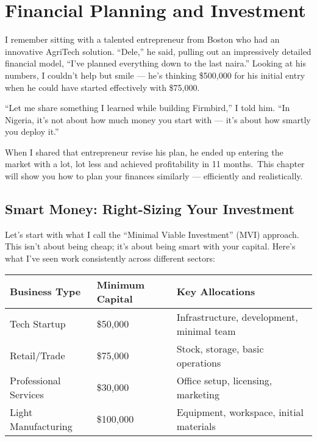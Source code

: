 \chapter{Financial Planning and Investment}\label{ch:financial-planning}

I remember sitting with a talented entrepreneur from Boston who had an innovative AgriTech solution. ``Dele,'' he said, pulling out an impressively detailed financial model, ``I've planned everything down to the last naira.'' Looking at his numbers, I couldn't help but smile --- he's thinking \$500,000 for his initial entry when he could have started effectively with \$75,000.

``Let me share something I learned while building Firmbird,'' I told him. ``In Nigeria, it's not about how much money you start with --- it's about how smartly you deploy it.''

\begin{importantbox}
When I shared that entrepreneur revise his plan, he ended up entering the market with a lot, lot less and achieved profitability in 11 months.\ This chapter will show you how to plan your finances similarly --- efficiently and realistically.
\end{importantbox}

\section{Smart Money: Right-Sizing Your Investment}\label{sec:smart-money}

Let's start with what I call the ``Minimal Viable Investment'' (MVI) approach. This isn't about being cheap; it's about being smart with your capital. Here's what I've seen work consistently across different sectors:

\begin{center}
\begin{tabularx}{\textwidth}{>{\raggedright\arraybackslash}X >{\centering\arraybackslash}X >{\raggedright\arraybackslash}X}
    \toprule
    \textbf{Business Type} & \textbf{Minimum Capital} & \textbf{Key Allocations} \\
    \midrule
    Tech Startup & \$50,000 & Infrastructure, development, minimal team \\
    Retail/Trade & \$75,000 & Stock, storage, basic operations \\
    Professional Services & \$30,000 & Office setup, licensing, marketing \\
    Light Manufacturing & \$100,000 & Equipment, workspace, initial materials \\
    \bottomrule
\end{tabularx}
\end{center}

